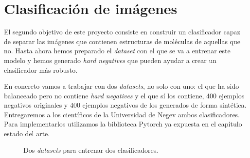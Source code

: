 \newpage
\section{Clasificación de imágenes}
El segundo objetivo de este proyecto consiste en construir un clasificador capaz de separar las imágenes que contienen estructuras de moléculas de aquellas que no. Hasta ahora hemos preparado el \textit{dataset} con el que se va a entrenar este modelo y hemos generado \textit{hard negatives} que pueden ayudar a crear un clasificador más robusto.

En concreto vamos a trabajar con dos \textit{datasets}, no solo con uno: el que ha sido balanceado pero no contiene \textit{hard negatives} y el que sí los contiene, 400 ejemplos negativos originales y 400 ejemplos negativos de los generados de forma sintética. Entregaremos a los científicos de la Universidad de Negev ambos clasificadores. Para implementarlos utilizamos la biblioteca Pytorch ya expuesta en el capítulo estado del arte.

\begin{figure}[H]
\centering
    \caption{Dos \textit{datasets} para entrenar dos clasificadores.} 
    \label{fig:two_final_datasets}
\end{figure}


